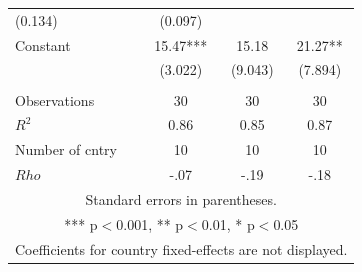 \documentclass[12pt]{report}
\begin{document}
\begin{table}[htdp]
\begin{center}
{\begin{tabular}{lccc}
(0.134) & (0.097) \\
Constant & 15.47*** & 15.18 & 21.27** \\  & (3.022) &
(9.043) & (7.894) \\
 &  &  &
 \\ Observations & 30 & 30 & 30 \\ $R^2$ & 0.86 & 0.85 & 0.87
\\ Number of cntry & 10 & 10 & 10 \\  $Rho$ & -.07 & -.19 & -.18 \\ \hline
\multicolumn{4}{c}{ Standard errors in parentheses.} \\
\multicolumn{4}{c}{ *** p$<$0.001, ** p$<$0.01, * p$<$0.05} \\
\multicolumn{4}{c}{ Coefficients for country fixed-effects are not displayed.
} \\

\end{tabular}
}
\end{center}
\label{default}
\end{table}
\end{document}
